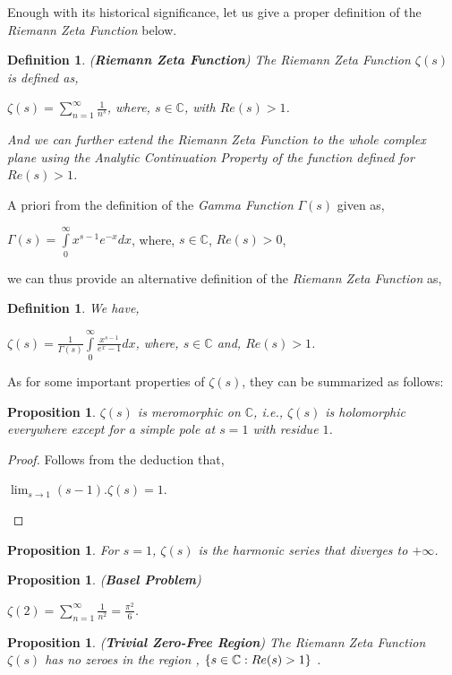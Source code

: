 \documentclass[article,12pt]{elsarticle}
\newtheorem{prop}[thm]{Proposition}
\newtheorem{dfn}[thm]{Definition}
\begin{document}
	Enough with its historical significance, let us give a proper definition of the \textit{Riemann Zeta Function} below.
	\begin{dfn}
		(\textbf{Riemann Zeta Function})  The \textit{Riemann Zeta Function} $\zeta(s)$ is defined as,
		\begin{center}
			$\zeta(s)=\sum\limits_{n=1}^{\infty}\frac{1}{n^{s}}$,     where,  $s\in \mathbb{C}$, with $Re(s)>1$.
		\end{center}
		And we can further extend the \textit{Riemann Zeta Function} to the whole complex plane using the \textit{Analytic Continuation Property} of the function defined for $Re(s)>1$.
	\end{dfn}
	A priori from the definition of the \textit{Gamma Function} $\Gamma(s)$ given as,
	\begin{center}
		$\Gamma(s)=\int\limits_{0}^{\infty}{x^{s-1}}{e^{-x}}dx$,  where, $s\in \mathbb{C}$,  $Re(s)>0$,
	\end{center}
	we can thus provide an alternative definition of the \textit{Riemann Zeta Function} as,
	\begin{dfn}
		We have,
		\begin{center}
			$\zeta(s)=\frac{1}{\Gamma(s)}\int\limits_{0}^{\infty}\frac{x^{s-1}}{e^{x}-1}dx$,    where, $s\in \mathbb{C}$ and,  $Re(s)>1$.
		\end{center}
	\end{dfn}
	As for some important properties of $\zeta(s)$, they can be summarized as follows:
	\begin{prop}
		$\zeta(s)$ is \textit{meromorphic} on $\mathbb{C}$, i.e., $\zeta(s)$ is \textit{holomorphic} everywhere except for a \textit{simple pole} at $s=1$ with \textit{residue} $1$.
	\end{prop}
	\begin{proof}
		Follows from the deduction that,
		\begin{center}
			$\lim_{s\rightarrow 1}(s-1).\zeta(s)=1$.
		\end{center}
	\end{proof}
	\begin{prop}
		For $s=1$, $\zeta(s)$ is the \textit{harmonic series} that \textit{diverges} to $+\infty$.
	\end{prop}
	\begin{prop}
		(\textbf{Basel Problem}) 
		\begin{center}
			$\zeta(2)=\sum\limits_{n=1}^{\infty}\frac{1}{n^{2}}=\frac{\pi^{2}}{6}$.
		\end{center}        
	\end{prop}
	\begin{prop}
		(\textbf{Trivial Zero-Free Region}) The Riemann Zeta Function $\zeta(s)$ has no zeroes in the region , $\{s\in \mathbb{C}\space :\space Re(s)>1\}$ .
	\end{prop}
	
\end{document}

